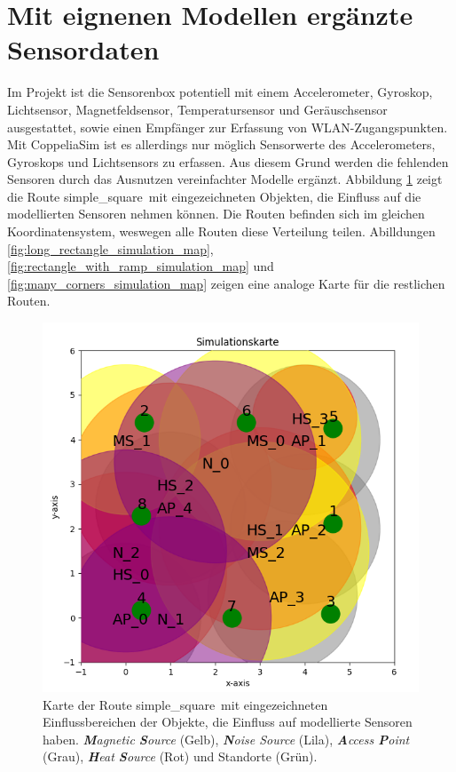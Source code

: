 \section{Mit eignenen Modellen ergänzte Sensordaten}
Im Projekt ist die Sensorenbox potentiell mit einem Accelerometer, Gyroskop, Lichtsensor, Magnetfeldsensor,
Temperatursensor und Geräuschsensor ausgestattet, sowie einen Empfänger zur Erfassung von WLAN-Zugangspunkten.
Mit CoppeliaSim ist es allerdings nur möglich Sensorwerte des Accelerometers, Gyroskops und Lichtsensors zu erfassen.
Aus diesem Grund werden die fehlenden Sensoren durch das Ausnutzen vereinfachter Modelle ergänzt.
\newline
\newline
Abbildung \ref{fig:simple_square_simulation_map} zeigt die Route \glqq simple\_square\grqq\ mit eingezeichneten Objekten,
die Einfluss auf die modellierten Sensoren nehmen können.
Die Routen befinden sich im gleichen Koordinatensystem, weswegen alle Routen diese Verteilung teilen.
Abilldungen \ref{fig:long_rectangle_simulation_map}, \ref{fig:rectangle_with_ramp_simulation_map} und \ref{fig:many_corners_simulation_map}
zeigen eine analoge Karte für die restlichen Routen.
\begin{figure}[h!]
    \centering
    \includegraphics[width=0.9\linewidth]{images/simple_square_simulation_map.png}
    \caption{Karte der Route \glqq simple\_square\grqq\ mit eingezeichneten Einflussbereichen der Objekte, die Einfluss auf modellierte Sensoren haben.
            \textit{\textbf{M}agnetic \textbf{S}ource} (Gelb), \textit{\textbf{N}oise Source} (Lila), \textit{\textbf{A}ccess \textbf{P}oint} (Grau),
            \textit{\textbf{H}eat \textbf{S}ource} (Rot) und Standorte (Grün).}
    \label{fig:simple_square_simulation_map}
\end{figure}

